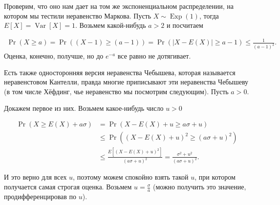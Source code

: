 \documentclass[12pt]{article}
\DeclareMathOperator{\Exp}{Exp}
\DeclareMathOperator{\Var}{Var}
\begin{document}
Проверим, что оно нам дает на том же экспоненциальном распределении, на котором мы тестили неравенство Маркова. Пусть $X \sim \Exp(1)$, тогда $E[X] = \Var[X] = 1$. Возьмем какой-нибудь $a > 2$ и посчитаем

\begin{align*}
  \Pr(X \ge a) = \Pr((X - 1) \ge (a - 1)) = \Pr(|X - E(X)| \ge a - 1) \le \frac{1}{(a - 1)^2}.
\end{align*}
Оценка, конечно, получше, но до $e^{-a}$ все равно не дотягивает.

Есть также односторонняя версия неравенства Чебышева, которая называется неравенстовом Кантелли, правда многие приписывают эти неравенства Чебышеву (в том числе Хёфдинг, чье неравенство мы посмотрим следующим). Пусть $a > 0$.


\begin{center}
\end{center}
\begin{center}
\end{center}

Докажем первое из них. Возьмем какое-нибудь число $u > 0$

\begin{align*}
  \Pr(X \ge E(X) + a\sigma) &= \Pr(X - E(X) + u \ge a\sigma + u) \\
      &\le \Pr((X - E(X) + u)^2 \ge (a\sigma + u)^2) \\
      &\le \frac{E[(X - E(X) + u)^2]}{(a\sigma + u)^2} = \frac{\sigma^2+ u^2}{(a\sigma + u)^2}.
\end{align*}

И это верно для всех $u$, поэтому можем спокойно взять такой $u$, при котором получается самая строгая оценка. Возьмем $u = \frac{\sigma}{a}$ (можно получить это значение, продифференцировав по $u$).
\end{document}
